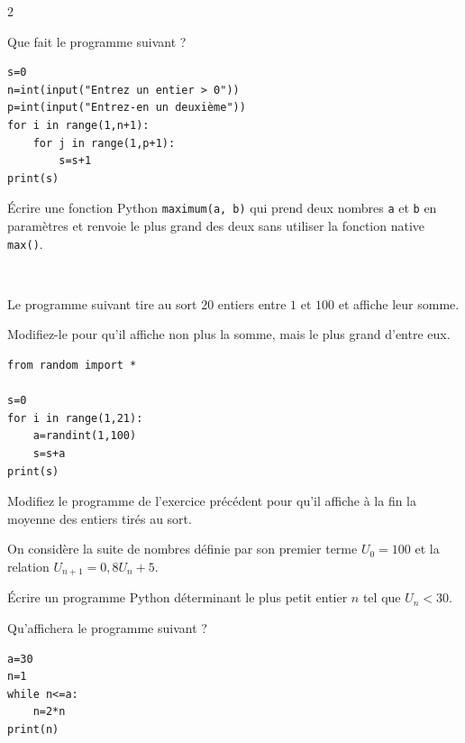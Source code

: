 {\begin{multicols}{2}
	  \begin{exo}{}
		  Que fait le programme suivant ?
		  {\footnotesize
		  \begin{lstlisting}
s=0
n=int(input("Entrez un entier > 0"))
p=int(input("Entrez-en un deuxième"))
for i in range(1,n+1):
    for j in range(1,p+1):
        s=s+1
print(s)
\end{lstlisting}
		  }
	  \end{exo}

	  \begin{exo}
		  Écrire une fonction Python \lstinline|maximum(a, b)| qui prend deux nombres \lstinline|a| et \lstinline|b| en paramètres et renvoie le plus grand des deux sans utiliser la fonction native \lstinline|max()|.
	  \end{exo}

	  \vfill~\columnbreak

	  \begin{exo}{}
		  Le programme suivant tire au sort $20$ entiers entre $1$ et $100$ et affiche leur somme.

		  Modifiez-le pour qu'il affiche non plus la somme, mais le plus grand d'entre eux.

		  \begin{lstlisting}
from random import *

s=0
for i in range(1,21):
    a=randint(1,100)
    s=s+a
print(s)
\end{lstlisting}
	  \end{exo}

	  \begin{exo}{}
		  Modifiez le programme de l'exercice précédent pour qu'il affiche à la fin la moyenne des entiers tirés au sort.
	  \end{exo}

	  \begin{exo}
		  On considère la suite de nombres définie par son premier terme $U_0 = 100$ et la relation $U_{n+1} = 0{,}8 U_n + 5$.

		  Écrire un programme Python déterminant le plus petit entier $n$ tel que $U_n < 30$.
	  \end{exo}

	  \begin{exo}{}
		  Qu'affichera le programme suivant ?

		  \begin{lstlisting}
a=30
n=1
while n<=a:
    n=2*n
print(n)
\end{lstlisting}
	  \end{exo}


\end{multicols}}
